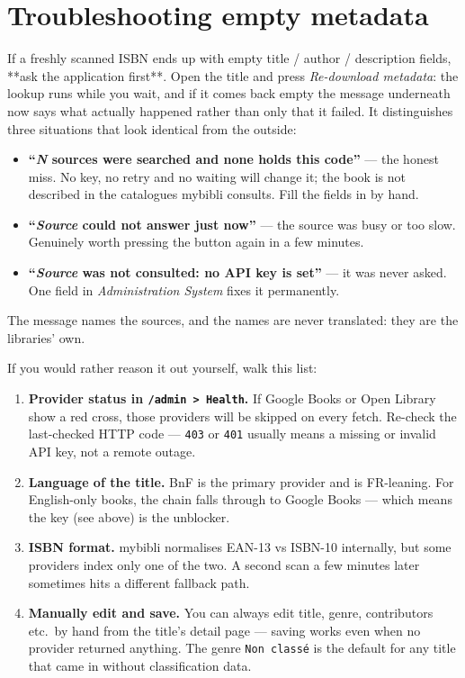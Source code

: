 \section{Troubleshooting empty metadata}

If a freshly scanned ISBN ends up with empty title / author /
description fields, **ask the application first**. Open the title
and press \emph{Re-download metadata}: the lookup runs while you
wait, and if it comes back empty the message underneath now says
what actually happened rather than only that it failed. It
distinguishes three situations that look identical from the
outside:

\begin{itemize}
  \item \textbf{``\emph{N} sources were searched and none holds
        this code''} \string— the honest miss. No key, no retry and
        no waiting will change it; the book is not described in
        the catalogues mybibli consults. Fill the fields in by
        hand.
  \item \textbf{``\emph{Source} could not answer just now''}
        \string— the source was busy or too slow. Genuinely worth
        pressing the button again in a few minutes.
  \item \textbf{``\emph{Source} was not consulted: no API key is
        set''} \string— it was never asked. One field in
        \emph{Administration \textrightarrow{} System} fixes it
        permanently.
\end{itemize}

The message names the sources, and the names are never translated:
they are the libraries' own.

If you would rather reason it out yourself, walk this list:

\begin{enumerate}
  \item \textbf{Provider status in \texttt{/admin > Health}.}
        If Google Books or Open Library show a red cross, those
        providers will be skipped on every fetch. Re-check the
        last-checked HTTP code — \texttt{403} or \texttt{401}
        usually means a missing or invalid API key, not a remote
        outage.
  \item \textbf{Language of the title.} BnF is the primary
        provider and is FR-leaning. For English-only books, the
        chain falls through to Google Books — which means the
        key (see above) is the unblocker.
  \item \textbf{ISBN format.} mybibli normalises EAN-13 vs ISBN-10
        internally, but some providers index only one of the two.
        A second scan a few minutes later sometimes hits a
        different fallback path.
  \item \textbf{Manually edit and save.} You can always edit
        title, genre, contributors etc.\ by hand from the title's
        detail page — saving works even when no provider returned
        anything. The genre \texttt{Non classé} is the default for
        any title that came in without classification data.
\end{enumerate}

